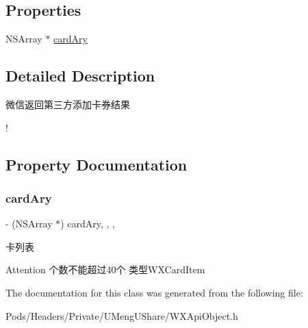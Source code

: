 \subsection*{Properties}
\begin{DoxyCompactItemize}
\item 
N\+S\+Array $\ast$ \mbox{\hyperlink{interface_add_card_to_w_x_card_package_resp_a92895ff63b32af977f5d3be71934c0af}{card\+Ary}}
\end{DoxyCompactItemize}


\subsection{Detailed Description}
微信返回第三方添加卡券结果 

! 

\subsection{Property Documentation}
\mbox{\label{interface_add_card_to_w_x_card_package_resp_a92895ff63b32af977f5d3be71934c0af}} 
\subsubsection{\texorpdfstring{card\+Ary}{cardAry}}
{\footnotesize\ttfamily -\/ (N\+S\+Array $\ast$) card\+Ary\hspace{0.3cm}{\ttfamily [read]}, {\ttfamily [write]}, {\ttfamily [nonatomic]}, {\ttfamily [retain]}}

卡列表 \begin{DoxyAttention}{Attention}
个数不能超过40个 类型\+W\+X\+Card\+Item 
\end{DoxyAttention}


The documentation for this class was generated from the following file\+:\begin{DoxyCompactItemize}
\item 
Pods/\+Headers/\+Private/\+U\+Meng\+U\+Share/W\+X\+Api\+Object.\+h\end{DoxyCompactItemize}
